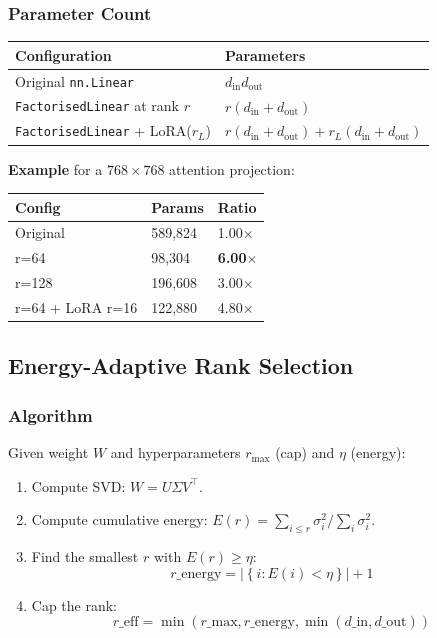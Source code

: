 \subsubsection{Parameter Count}

\begin{table}[H]
\centering
\small
\begin{tabular}{ll}
\toprule
\textbf{Configuration} & \textbf{Parameters} \\
\midrule
Original \texttt{nn.Linear} & $d_\text{in} d_\text{out}$ \\
\texttt{FactorisedLinear} at rank $r$ & $r(d_\text{in} + d_\text{out})$ \\
\texttt{FactorisedLinear} + LoRA($r_L$) & $r(d_\text{in} + d_\text{out}) + r_L(d_\text{in} + d_\text{out})$ \\
\bottomrule
\end{tabular}
\end{table}

\textbf{Example} for a $768 \times 768$ attention projection:

\begin{table}[H]
\centering
\small
\begin{tabular}{lll}
\toprule
\textbf{Config} & \textbf{Params} & \textbf{Ratio} \\
\midrule
Original & 589,824 & 1.00$\times$ \\
r=64 & 98,304 & \textbf{6.00$\times$} \\
r=128 & 196,608 & 3.00$\times$ \\
r=64 + LoRA r=16 & 122,880 & 4.80$\times$ \\
\bottomrule
\end{tabular}
\end{table}

\subsection{Energy-Adaptive Rank Selection}

\subsubsection{Algorithm}

Given weight $W$ and hyperparameters $r_\text{max}$ (cap) and $\eta$ (energy):

\begin{enumerate}
\item Compute SVD: $W = U \Sigma V^\top$.
\item Compute cumulative energy: $E(r) = \sum_{i \leq r} \sigma_i^2 / \sum_i \sigma_i^2$.
\item Find the smallest $r$ with $E(r) \geq \eta$:
  $$
  r\_\text{energy} = \left|\left\{i : E(i) < \eta\right\}\right| + 1
  \tag{4.3}
  $$
\item Cap the rank:
  $$
  r\_\text{eff} = \min(r\_\text{max}, r\_\text{energy}, \min(d\_\text{in}, d\_\text{out}))
  \tag{4.4}
  $$

\end{enumerate}
